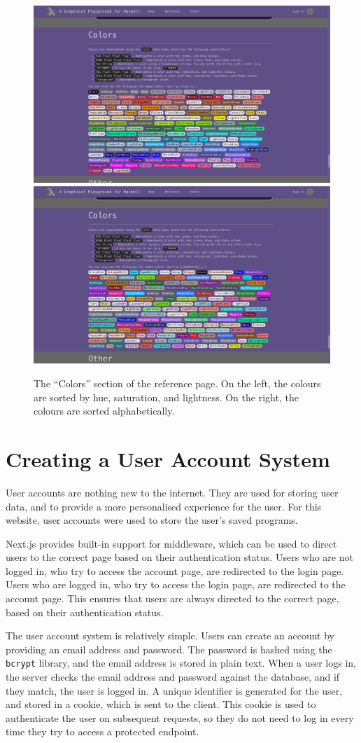 \documentclass[../main.tex]{subfiles}
\begin{document}
        \begin{figure}[H]
            \centering
            \includegraphics[width=0.45\linewidth]{images/colours.png}
            \includegraphics[width=0.45\linewidth]{images/coloursAlphabetical.png}
                \caption{The ``Colors'' section of the reference page.
                    On the left, the colours are sorted by hue, saturation, and lightness.
                    On the right, the colours are sorted alphabetically.
                }
                \label{fig:colours}
        \end{figure}

    \section{Creating a User Account System}
        User accounts are nothing new to the internet.
        They are used for storing user data, and to provide a more personalised
            experience for the user.
        For this website, user accounts were used to store the user's saved programs.

        Next.js provides built-in support for middleware, which can be used to direct
            users to the correct page based on their authentication status.
        Users who are not logged in, who try to access the account page, are redirected
            to the login page.
        Users who are logged in, who try to access the login page, are redirected to
            the account page.
        This ensures that users are always directed to the correct page, based on their
            authentication status.

        The user account system is relatively simple.
        Users can create an account by providing an email address and password.
        The password is hashed using the \texttt{bcrypt} library, and the email address
            is stored in plain text.
        When a user logs in, the server checks the email address and password against
            the database, and if they match, the user is logged in.
        A unique identifier is generated for the user, and stored in a cookie, which is
            sent to the client.
        This cookie is used to authenticate the user on subsequent requests, so they do
            not need to log in every time they try to access a protected endpoint.
\end{document}
